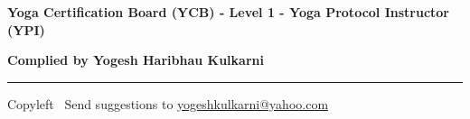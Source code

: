 
\usepackage{polyglossia}
\setdefaultlanguage{sanskrit}

\usepackage{fontspec}
\setmainfont{Segoe UI}
\newfontfamily{}
\newfontfamily{}


\graphicspath{{images/}}


\footnotesize

\thispagestyle{empty}  %

\thispagestyle{fancy} 

\begin{center}
\Large{\textbf{Yoga Certification Board (YCB) - Level 1 - Yoga Protocol Instructor (YPI)}}

\large{\textbf{Complied by Yogesh Haribhau Kulkarni}}
\end{center}


\begin{multicols}{2}

\end{multicols}

\rule{\linewidth}{0.25pt}
\scriptsize
Copyleft \textcopyleft\  Send suggestions to 
\href{http://www.yogeshkulkarni.com}{yogeshkulkarni@yahoo.com}




